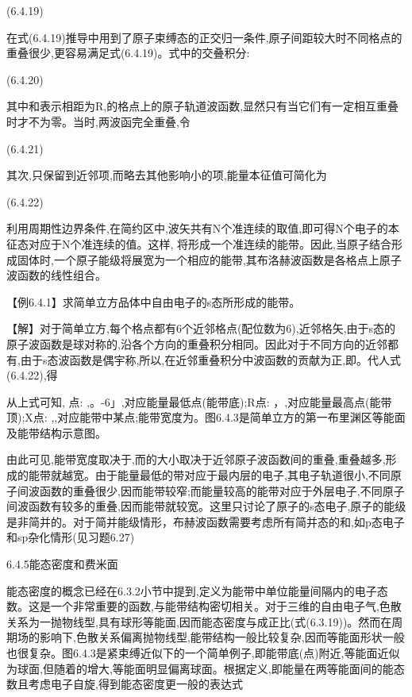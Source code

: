  	(6.4.19)

在式(6.4.19)推导中用到了原子束缚态的正交归一条件,原子间距较大时不同格点的重叠很少,更容易满足式(6.4.19)。式中的交叠积分:

 	(6.4.20)

其中和表示相距为R,的格点上的原子轨道波函数,显然只有当它们有一定相互重叠时才不为零。当时,两波函完全重叠,令

 	(6.4.21)

其次,只保留到近邻项,而略去其他影响小的项,能量本征值可简化为

 	(6.4.22)

利用周期性边界条件,在简约区中,波矢共有N个准连续的取值,即可得N个电子的本征态对应于N个准连续的值。这样, 将形成一个准连续的能带。因此,当原子结合形成固体时,一个原子能级将展宽为一个相应的能带,其布洛赫波函数是各格点上原子波函数的线性组合。

【例6.4.1】求简单立方品体中自由电子的s态所形成的能带。

【解】对于简单立方,每个格点都有6个近邻格点(配位数为6),近邻格矢,由于s态的原子波函数是球对称的,沿各个方向的重叠积分相同。因此对于不同方向的近邻都有,由于s态波函数是偶宇称,所以,在近邻重叠积分中波函数的贡献为正,即。代人式(6.4.22),得



从上式可知, 点: ,。-6」,对应能量最低点(能带底);R点: ，,对应能量最高点(能带顶);X点: ,,对应能带中某点;能带宽度为。图6.4.3是简单立方的第一布里渊区等能面及能带结构示意图。



由此可见,能带宽度取决于,而的大小取决于近邻原子波函数间的重叠,重叠越多,形成的能带就越宽。由于能量最低的带对应于最内层的电子,其电子轨道很小,不同原子间波函数的重叠很少,因而能带较窄;而能量较高的能带对应于外层电子,不同原子间波函数有较多的重叠,因而能带就较宽。这里只讨论了原子的s态电子,原子的能级是非简并的。对于简并能级情形，布赫波函数需要考虑所有简并态的和,如p态电子和sp杂化情形(见习题6.27)





6.4.5能态密度和费米面

能态密度的概念已经在6.3.2小节中提到,定义为能带中单位能量间隔内的电子态数。这是一个非常重要的函数,与能带结构密切相关。对于三维的自由电子气,色散关系为一抛物线型,具有球形等能面,因而能态密度与成正比(式(6.3.19))。然而在周期场的影响下,色散关系偏离抛物线型,能带结构一般比较复杂,因而等能面形状一般也很复杂。图6.4.3是紧束缚近似下的一个简单例子,即能带底(点)附近,等能面近似为球面,但随着的增大,等能面明显偏离球面。根据定义,即能量在两等能面间的能态数且考虑电子自旋,得到能态密度更一般的表达式

